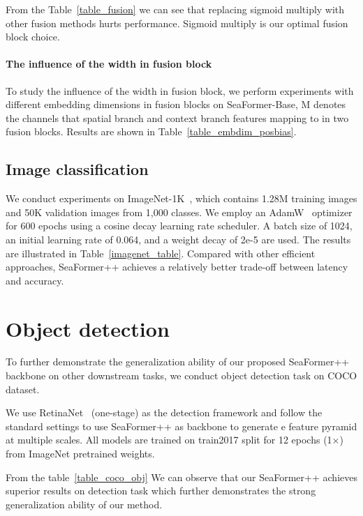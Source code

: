 From the Table~\ref{table_fusion} we can see that replacing sigmoid multiply with other fusion methods hurts performance. 
Sigmoid multiply is our optimal fusion block choice.



\paragraph{The influence of the width in fusion block}
To study the influence of the width in fusion block, we perform experiments with different embedding dimensions in fusion blocks on SeaFormer-Base, M denotes the channels that spatial branch and context branch features mapping to in two fusion blocks. Results are shown in Table~\ref{table_embdim_posbias}.


\subsection{Image classification}
\label{sec:imgnet_training}
We conduct experiments on ImageNet-1K~\cite{deng2009imagenet}, which contains 1.28M training images and 50K validation images from 1,000 classes. We employ an AdamW~\cite{kingma2014adam} optimizer for 600 epochs using a cosine decay learning rate scheduler. A batch size of 1024, an initial learning rate of 0.064, and a weight decay of 2e-5 are used. The results are illustrated in Table~\ref{imagenet_table}. Compared with other efficient approaches, SeaFormer++ achieves a relatively better trade-off between latency and accuracy.




\section{Object detection}
To further demonstrate the generalization ability of our proposed SeaFormer++ backbone on other downstream tasks, we conduct object detection task on COCO dataset. 

We use RetinaNet~\cite{lin2017focal} (one-stage) as the detection framework and follow the standard settings to use SeaFormer++ as backbone to generate e feature pyramid at multiple scales. All models are trained  on train2017 split for 12 epochs (1×) from ImageNet pretrained weights.

From the table~\ref{table_coco_obj} We can observe that our SeaFormer++ achieves superior results on detection task which further demonstrates the strong generalization ability of our method.


